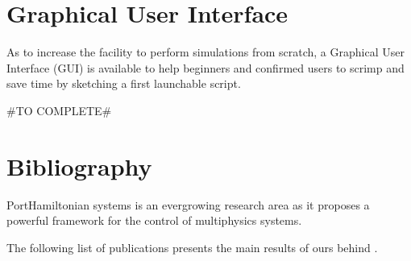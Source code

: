 \documentclass[letterpaper,10pt,english]{sphinxmanual}
\begin{document}
\sphinxstepscope


\section{Graphical User Interface}
\label{\detokenize{GUI:graphical-user-interface}}\label{\detokenize{GUI::doc}}\label{\detokenize{GUI:gui}}
\sphinxAtStartPar
As to increase the facility to perform simulations from scratch, a Graphical User Interface (GUI) is available to help beginners and confirmed users to scrimp and save time by sketching a first launchable script.

\sphinxAtStartPar
\#TO COMPLETE\#

\sphinxstepscope


\section{Bibliography}
\label{\detokenize{biblio:bibliography}}\label{\detokenize{biblio::doc}}\label{\detokenize{biblio:biblio}}
\sphinxAtStartPar
Port\sphinxhyphen{}Hamiltonian systems is an ever\sphinxhyphen{}growing research area as it proposes a powerful framework for the control of multi\sphinxhyphen{}physics systems.

\sphinxAtStartPar
The following list of publications presents the main results of ours behind .
\end{document}
